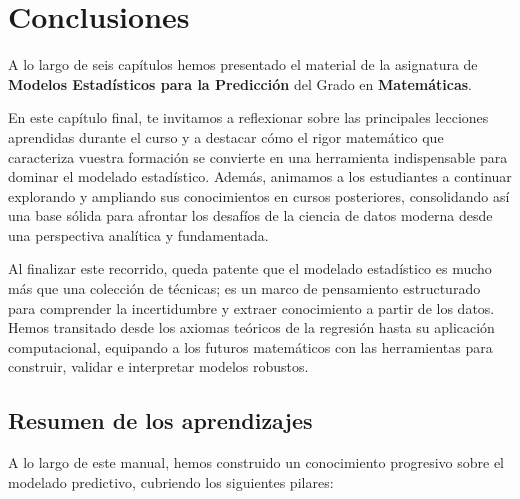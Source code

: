 \documentclass[
  letterpaper,
  DIV=11,
  numbers=noendperiod]{scrreprt}
\begin{document}

\chapter{Conclusiones}\label{sec-conclusiones}

A lo largo de seis capítulos hemos presentado el material de la
asignatura de \textbf{Modelos Estadísticos para la Predicción} del Grado
en \textbf{Matemáticas}.

En este capítulo final, te invitamos a reflexionar sobre las principales
lecciones aprendidas durante el curso y a destacar cómo el rigor
matemático que caracteriza vuestra formación se convierte en una
herramienta indispensable para dominar el modelado estadístico. Además,
animamos a los estudiantes a continuar explorando y ampliando sus
conocimientos en cursos posteriores, consolidando así una base sólida
para afrontar los desafíos de la ciencia de datos moderna desde una
perspectiva analítica y fundamentada.

Al finalizar este recorrido, queda patente que el modelado estadístico
es mucho más que una colección de técnicas; es un marco de pensamiento
estructurado para comprender la incertidumbre y extraer conocimiento a
partir de los datos. Hemos transitado desde los axiomas teóricos de la
regresión hasta su aplicación computacional, equipando a los futuros
matemáticos con las herramientas para construir, validar e interpretar
modelos robustos.

\section{Resumen de los aprendizajes}\label{resumen-de-los-aprendizajes}

A lo largo de este manual, hemos construido un conocimiento progresivo
sobre el modelado predictivo, cubriendo los siguientes pilares:
\end{document}
